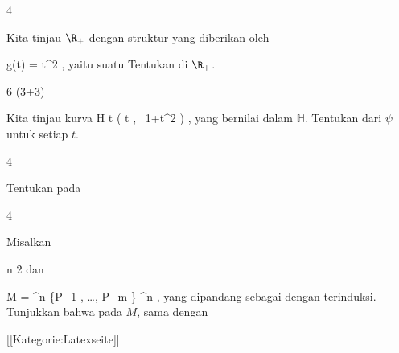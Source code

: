 {4}
{

Kita tinjau $\R_+$ dengan struktur yang diberikan oleh

\mavergleichskette
{\vergleichskette
{ g(t)
}
{ = }{ t^2
}
{  }{
}
{    }{
}
{   }{
}
}
{}{}{,}
yaitu suatu
Tentukan
di $\R_+$.

}
{} {}

{6 (3+3)}
{

Kita tinjau kurva
\maabbeledisp {\psi} {\R} { {\mathbb H}
} { t } { \left(  t   , \,   1+t^2                   \right)
} {,}
yang bernilai dalam
${\mathbb H}$.
 {Tentukan
dari $\psi$ untuk setiap $t$.
}

}
{} {}

{4}
{

Tentukan
pada

}
{} {}

{4}
{

Misalkan

\mavergleichskette
{\vergleichskette
{ n
}
{ \geq }{ 2
}
{  }{
}
{    }{
}
{   }{
}
}
{}{}{}
dan

\mavergleichskettedisp
{\vergleichskette
{ M
}
{ =} { \R^n \setminus \{P_1  , \ldots , P_m \}
}
{ \subseteq} { \R^n
}
{ } {
}
{ } {
}
}
{}{}{,}
yang dipandang sebagai
dengan
terinduksi. Tunjukkan bahwa pada $M$,
sama dengan

}
{} {}

 [[Kategorie:Latexseite]]
